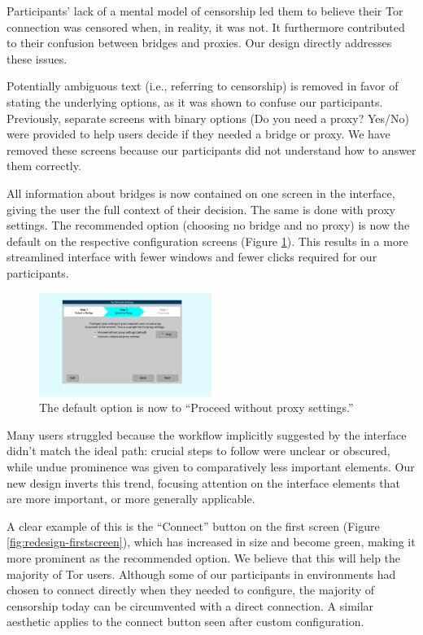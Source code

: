 \documentclass{template}
\begin{document}
Participants' lack of a mental model of censorship led them to believe their
Tor connection was censored when, in reality, it was not. It furthermore contributed
to their confusion between bridges and proxies. Our design directly addresses
these issues.

Potentially ambiguous text (i.e., referring to censorship) is removed in favor
of stating the underlying options, as it was shown to confuse our participants.
Previously, separate screens with binary options (Do you need a proxy? Yes/No) 
were provided to help users decide if they needed a bridge or proxy.
We have removed these screens
because our participants did not understand how to answer them correctly.

All information about bridges is now contained on one
screen in the interface, giving the user the full context of their decision.
The same is done with proxy settings.
The recommended option (choosing no bridge and no proxy) is now the default on
the respective configuration screens (Figure \ref{fig:redesign-noproxy}).
This results in a more streamlined interface with fewer windows
and fewer clicks required for our participants. \\

\begin{figure}[h]
  \centering
    \includegraphics[width=0.5\textwidth]{redesign-noproxy.png}
    \caption{The default option is now to ``Proceed without proxy settings.''}
\label{fig:redesign-noproxy}
\end{figure}

Many users struggled because the workflow implicitly suggested by the interface
didn't match the ideal path: crucial steps to follow were unclear or obscured,
while undue prominence was given to comparatively less important elements.
Our new design inverts this trend, focusing attention on the interface elements
that are more important, or more generally applicable.

A clear example of this is the ``Connect'' button on the first screen
(Figure \ref{fig:redesign-firstscreen}), which has
increased in size and become green, making it more prominent as the recommended
option. We believe that this will help the majority of Tor users. 
Although some of our participants in environments had chosen to connect
directly when they needed to configure,
the majority of censorship today can be circumvented with a direct connection. 
A similar aesthetic applies to the connect button seen after custom
configuration.
\end{document}
